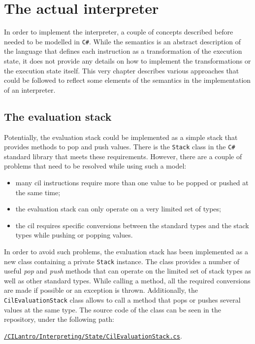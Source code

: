 \documentclass[declaration,shortabstract,english,mgr]{iithesis}
\begin{document}
\section{The actual interpreter}

In order to implement the interpreter, a couple of concepts described before needed to be modelled in \texttt{C\#}. While the semantics is an abstract description of the language that defines each instruction as a transformation of the execution state, it does not provide any details on how to implement the transformations or the execution state itself. This very chapter describes various approaches that could be followed to reflect some elements of the semantics in the implementation of an interpreter.

\subsection{The evaluation stack}

Potentially, the evaluation stack could be implemented as a simple stack that provides methods to pop and push values. There is the \texttt{Stack} class in the \texttt{C\#} standard library that meets these requirements. However, there are a couple of problems that need to be resolved while using such a model:
\begin{itemize}
	\item{many \acrshort{cil} instructions require more than one value to be popped or pushed at the same time;}
	\item{the evaluation stack can only operate on a very limited set of types;}
	\item{the \acrshort{cil} requires specific conversions between the standard types and the stack types while pushing or popping values.}
\end{itemize}

In order to avoid such problems, the evaluation stack has been implemented as a new class containing a private \texttt{Stack} instance. The class provides a number of useful \textit{pop} and \textit{push} methods that can operate on the limited set of stack types as well as other standard types. While calling a method, all the required conversions are made if possible or an exception is thrown. Additionally, the \texttt{CilEvaluationStack} class allows to call a method that pops or pushes several values at the same type. The source code of the class can be seen in the repository, under the following path: 
\begin{center}
\href{https://github.com/kvasnyk/CILantro/blob/master/CILantro/CILantro/Interpreting/State/CilEvaluationStack.cs}{\texttt{/CILantro/Interpreting/State/CilEvaluationStack.cs}}.
\end{center}
\end{document}
